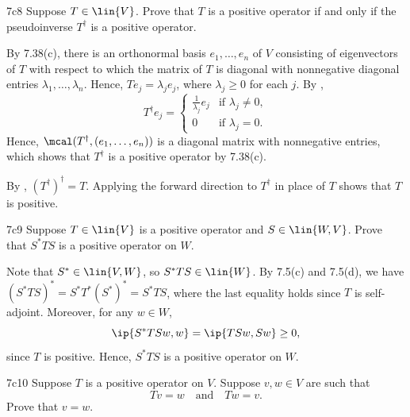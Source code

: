 \begin{exercise}{7c8}
    Suppose $T \in \lin{V}$.
    Prove that $T$ is a positive operator if and only if the pseudoinverse $T^\dagger$ is a positive operator.
\end{exercise}

\begin{soliff}
    \rightimp By 7.38(c), there is an orthonormal basis $e_1, \ldots, e_n$ of $V$ consisting of eigenvectors of $T$ with respect to which the matrix of $T$ is diagonal with nonnegative diagonal entries $\lambda_1, \ldots, \lambda_n$.
    Hence, $T e_j = \lambda_j e_j$, where $\lambda_j \geq 0$ for each $j$.
    By ,
    \[
        T^\dagger e_j = 
        \begin{cases}
            \frac{1}{\lambda_j} e_j & \text{if } \lambda_j \neq 0, \\
            0 & \text{if } \lambda_j = 0.
        \end{cases}
    \]
    Hence, $\mcal(T^\dagger, (e_1, \ldots, e_n))$ is a diagonal matrix with nonnegative entries, which shows that $T^\dagger$ is a positive operator by 7.38(c).

    \leftimp By , $(T^\dagger)^\dagger = T$. 
    Applying the forward direction to $T^\dagger$ in place of $T$ shows that $T$ is positive.
\end{soliff}

\begin{exercise}{7c9}
    Suppose $T \in \lin{V}$ is a positive operator and $S \in \lin{W, V}$.
    Prove that $S^\ast T S$ is a positive operator on $W$.
\end{exercise}

\begin{sol}
    Note that $S^\ast \in \lin{V, W}$, so $S^\ast T S \in \lin{W}$.
    By 7.5(c) and 7.5(d), we have $(S^\ast T S)^\ast = S^\ast T^\ast (S^\ast)^\ast = S^\ast T S$, where the last equality holds since $T$ is self-adjoint.
    Moreover, for any $w \in W$,
    \[
        \ip{S^\ast T S w, w} = \ip{T S w, S w} \geq 0,
    \]
    since $T$ is positive.
    Hence, $S^\ast T S$ is a positive operator on $W$.
\end{sol}

\begin{exercise}{7c10}
    Suppose $T$ is a positive operator on $V$.
    Suppose $v, w \in V$ are such that
    \[
        Tv = w \quad \text{and} \quad Tw = v.
    \]
    Prove that $v = w$.

\end{exercise}

